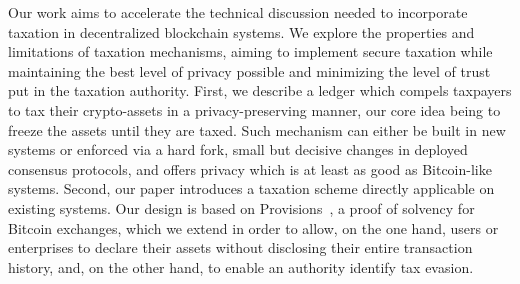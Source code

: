 Our work aims to accelerate the technical discussion needed to incorporate
taxation in decentralized blockchain systems. We explore the properties and
limitations of taxation mechanisms, aiming to implement secure taxation while
maintaining the best level of privacy possible and minimizing the level of
trust put in the taxation authority. First, we describe a ledger which compels
taxpayers to tax their crypto-assets in a privacy-preserving manner, our core
idea being to freeze the assets until they are taxed. Such mechanism can either
be built in new systems or enforced via a hard fork, \ie small but decisive
changes in deployed consensus protocols, and offers privacy which is at least
as good as Bitcoin-like systems. Second, our paper introduces a taxation scheme
directly applicable on existing systems. Our design is based on
Provisions~\cite{CCS:DBBCB15}, a proof of solvency for Bitcoin exchanges, which
we extend in order to allow, on the one hand, users or enterprises to declare
their assets without disclosing their entire transaction history, and, on the
other hand, to enable an authority identify tax evasion.

